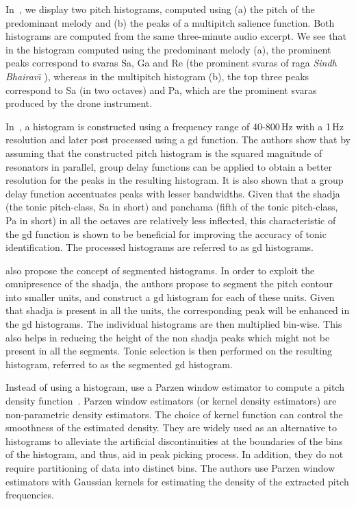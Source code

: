 In~, we display two pitch histograms, computed using (a) the pitch of the predominant melody and (b) the peaks of a multipitch salience function. Both histograms are computed from the same three-minute audio excerpt. We see that in the histogram computed using the predominant melody (a), the prominent peaks correspond to \glspl{svara} Sa, Ga and Re (the prominent \glspl{svara} of \gls{raga} \textit{Sindh Bhairav\={\i}} ), whereas in the multipitch histogram (b), the top three peaks correspond to Sa (in two octaves) and Pa, which are the prominent \glspl{svara} produced by the drone instrument. 

In~\cite{Ashwin_Istanbul2012}, a histogram is constructed using a frequency range of 40-800\,Hz with a 1\,Hz resolution and later post processed using a \gls{gd} function. The authors show that by assuming that the constructed pitch histogram is the squared magnitude of resonators in parallel, group delay functions can be applied to obtain a better resolution for the peaks in the resulting histogram. It is also shown that a group delay function accentuates peaks with lesser bandwidths. Given that the \gls{shadja} (the tonic pitch-class, Sa in short) and \gls{panchama} (fifth of the tonic pitch-class, Pa in short) in all the octaves are relatively less inflected, this characteristic of the \gls{gd} function is shown to be beneficial for improving the accuracy of tonic identification. The processed histograms are referred to as \gls{gd} histograms.

\cite{Ashwin_Istanbul2012} also propose the concept of segmented histograms. In order to exploit the omnipresence of the \gls{shadja},  the authors propose to segment the pitch contour into smaller units, and construct a \gls{gd} histogram for each of these units. Given that \gls{shadja} is present in all the units, the corresponding peak will be enhanced in the \gls{gd} histograms. The individual histograms are then multiplied bin-wise. This also helps in reducing the height of the non \gls{shadja} peaks which might not be present in all the segments. Tonic selection is then performed on the resulting histogram, referred to as the segmented \gls{gd} histogram.

Instead of using a histogram, \cite{ranjani2011carnatic} use a Parzen window estimator to compute a pitch density function~\citep{Bishop,DudaHart2000}. Parzen window estimators (or kernel density estimators) are non-parametric density estimators. The choice of kernel function can control the smoothness of the estimated density. They are widely used as an alternative to histograms to alleviate the artificial discontinuities at the boundaries of the bins of the histogram, and thus, aid in peak picking process. In addition, they do not require partitioning of data into distinct bins. The authors use Parzen window estimators with Gaussian kernels for estimating the density of the extracted pitch frequencies.


